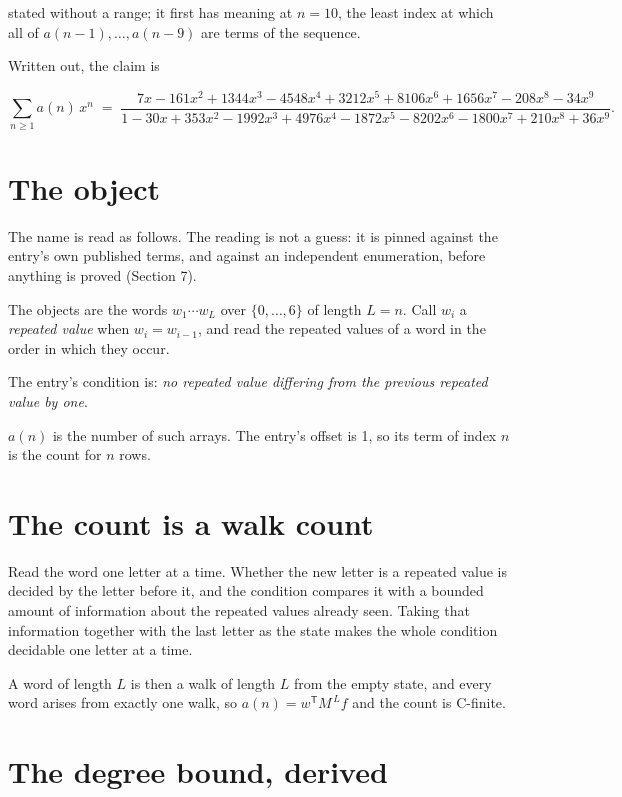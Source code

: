\documentclass[11pt]{article}
\theoremstyle{definition}
\begin{document}
stated without a range; it first has meaning at $n = 10$, the least index at which all of $a(n-1),\dots,a(n-9)$ are terms of the sequence.

Written out, the claim is

\[\sum_{n \ge 1} a(n)\,x^n \;=\; \frac{7x - 161x^{2} + 1344x^{3} - 4548x^{4} + 3212x^{5} + 8106x^{6} + 1656x^{7} - 208x^{8} - 34x^{9}}{1 - 30x + 353x^{2} - 1992x^{3} + 4976x^{4} - 1872x^{5} - 8202x^{6} - 1800x^{7} + 210x^{8} + 36x^{9}}.\]

\section{The object}

The name is read as follows. The reading is not a guess: it is pinned against the entry's own published terms, and against an independent enumeration, before anything is proved (Section 7).

The objects are the words $w_1\cdots w_L$ over $\{0,\dots,6\}$ of length $L = n$. Call $w_i$ a {\itshape repeated value} when $w_i = w_{i-1}$, and read the repeated values of a word in the order in which they occur.

The entry's condition is: {\itshape no repeated value differing from the previous repeated value by one}.

$a(n)$ is the number of such arrays. The entry's offset is 1, so its term of index $n$ is the count for $n$ rows.

\section{The count is a walk count}

Read the word one letter at a time. Whether the new letter is a repeated value is decided by the letter before it, and the condition compares it with a bounded amount of information about the repeated values already seen. Taking that information together with the last letter as the state makes the whole condition decidable one letter at a time.

A word of length $L$ is then a walk of length $L$ from the empty state, and every word arises from exactly one walk, so $a(n) = w^{\mathsf T}M^{\,L}f$ and the count is C-finite.

\section{The degree bound, derived}
\end{document}
